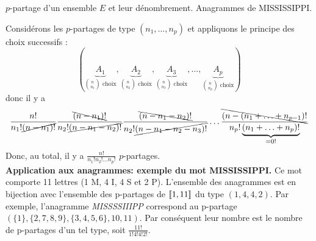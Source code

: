 \documentclass{article}
\begin{document}
\begin{question_kholle}
	[Soit $p \in \N^*$. Un $p$-partage de $E$ est un $p$-liste $(A_1, \ldots, A_p) \in \mathcal{P}(E)^p$ de parties de $E$ (éventuellement vide), deux à deux disjointes qui recouvrent $E$, i.e.
		\begin{equation*}
			\forall (i, j) \in \lient 1 ; p \rient,
			i \neq j \implies A_i \cap A_j = \emptyset
			\qquad \text{et} \qquad
			\bigcup_{i=1}^{p} A_i = E
		\end{equation*}
		Soient $(n_1, \ldots n_p) \in \N^p$ \tqs $n = n_1 + \cdots + n_p$. Un $p$-partage de $E$ de type $(n_{1},\dots,n_{p})$ est un $p$-partage $(A_{1},\dots,A_{p})$ de $E$ tel que
		\begin{equation*}
			\forall (i, j) \in \iset{1,p},|A_i| = n_i
		\end{equation*}
		Le nombre de $p$-partage de type $(n_1, \ldots, n_p)$ est :
		\begin{equation}
			\frac{n!}{\displaystyle \prod_{i=1}^{p} n_i !}
		\end{equation}
	]
	{$p$-partage d'un ensemble $E$ et leur dénombrement. Anagrammes de MISSISSIPPI.}

	Considérons les $p$-partages de type $(n_1, \ldots, n_p)$ et appliquons le principe des choix successifs :
	\begin{equation*}
		\left(
		\underbrace{A_1}_{\binom{n}{n_1} \text{ choix}},
		\underbrace{A_2}_{\binom{n}{n_2} \text{ choix}},
		\underbrace{A_3}_{\binom{n}{n_3} \text{ choix}},
		\ldots,
		\underbrace{A_p}_{\binom{n}{n_p} \text{ choix}}
		\right)
	\end{equation*}
	donc il y a
	\begin{equation*}
		\frac{ n! }{n_1! \cancel{(n-n_1)!} }
		\frac{ \bcancel{(n-n_1)!} }{n_2! \cancel{(n-n_1-n_2)!} }
		\frac{ \bcancel{(n-n_1-n_2)!} }{n_2! \cancel{(n-n_1-n_2-n_3)!} }
		\ldots
		\frac{ \bcancel{(n-(n_1+\ldots+n_{p-1})!} }{n_p! \underbrace{(n_1+\ldots+n_p)!}_{=0!} }
	\end{equation*}
	Donc, au total, il y a $\displaystyle\frac{n!}{n_1! n_2! \ldots n_p!}$ $p$-partages.\\

	\vspace{1em}\noindent\textbf{Application aux anagrammes: exemple du mot MISSISSIPPI.} Ce mot comporte 11 lettres (1 M, 4 I, 4 S et 2 P). L’ensemble des anagrammes est en bijection avec l’ensemble des p-partages de $[\![ 1,11 ]\!]$ du type $(1,4,4,2)$. Par exemple, l’anagramme \textit{MISSSSIIIPP} correspond au p-partage $(\{1\}, \{2,7,8,9\}, \{3,4,5,6\}, {10,11})$. Par conséquent leur nombre est le nombre de p-partages d’un tel type, soit $\displaystyle\frac{11!}{1!4!4!2!}$.
\end{question_kholle}
\end{document}
